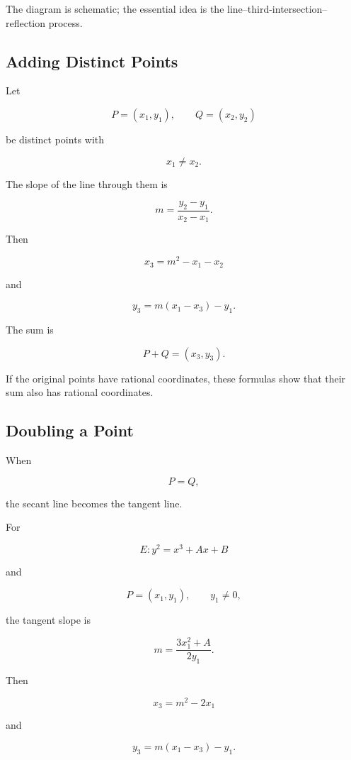 The diagram is schematic; the essential idea is the
line--third-intersection--reflection process.

\subsection{Adding Distinct Points}
\label{subsec:elliptic-add-distinct-points}

Let

\[ P=(x_1,y_1),\qquad Q=(x_2,y_2) \]

be distinct points with

\[ x_1\neq x_2. \]

The slope of the line through them is

\[ m=\frac{y_2-y_1}{x_2-x_1}. \]

Then

\[ \boxed{x_3=m^2-x_1-x_2} \]

and

\[ \boxed{y_3=m(x_1-x_3)-y_1}. \]

The sum is

\[ P+Q=(x_3,y_3). \]

If the original points have rational coordinates, these formulas show that
their sum also has rational coordinates.

\subsection{Doubling a Point}
\label{subsec:elliptic-point-doubling}

When

\[ P=Q, \]

the secant line becomes the tangent line.

For

\[ E:y^2=x^3+Ax+B \]

and

\[ P=(x_1,y_1),\qquad y_1\neq0, \]

the tangent slope is

\[ m=\frac{3x_1^2+A}{2y_1}. \]

Then

\[ x_3=m^2-2x_1 \]

and

\[ y_3=m(x_1-x_3)-y_1. \]

